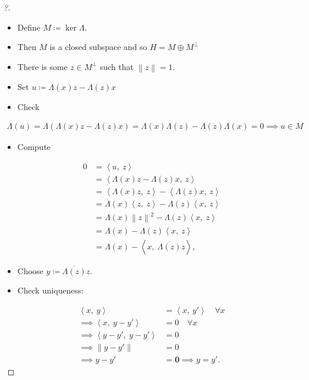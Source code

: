 \begin{proof}[?]

\envlist

\begin{itemize}
\tightlist
\item
  Define \(M \coloneqq\ker \Lambda\).
\item
  Then \(M\) is a closed subspace and so \(H = M \oplus M^\perp\)
\item
  There is some \(z\in M^\perp\) such that
  \({\left\lVert {z} \right\rVert} = 1\).
\item
  Set \(u \coloneqq\Lambda(x) z - \Lambda(z) x\)
\item
  Check
\end{itemize}

\begin{align*}\Lambda(u) = \Lambda(\Lambda(x) z - \Lambda(z) x) = \Lambda(x) \Lambda(z) - \Lambda(z) \Lambda(x) = 0 \implies u\in M\end{align*}

\begin{itemize}
\tightlist
\item
  Compute
\end{itemize}

\begin{align*}
0 &= {\left\langle {u},~{z} \right\rangle} \\ 
&= {\left\langle {\Lambda(x) z - \Lambda(z) x},~{z} \right\rangle} \\
&= {\left\langle {\Lambda(x) z},~{z} \right\rangle} - {\left\langle {\Lambda(z) x},~{z} \right\rangle} \\
&= \Lambda(x) {\left\langle {z},~{z} \right\rangle} - \Lambda(z) {\left\langle {x},~{z} \right\rangle} \\
&= \Lambda(x) {\left\lVert {z} \right\rVert}^2 - \Lambda(z) {\left\langle {x},~{z} \right\rangle} \\
&= \Lambda(x) - \Lambda(z) {\left\langle {x},~{z} \right\rangle} \\
&= \Lambda(x) -  {\left\langle {x},~{\overline{\Lambda(z)} z} \right\rangle}
,\end{align*}

\begin{itemize}
\tightlist
\item
  Choose \(y \coloneqq\overline{\Lambda(z)} z\).
\item
  Check uniqueness:
\end{itemize}

\begin{align*}
{\left\langle {x},~{y} \right\rangle} &= {\left\langle {x},~{y'} \right\rangle} \quad\forall x \\
\implies  {\left\langle {x},~{y-y'} \right\rangle} &= 0 \quad\forall x \\
\implies {\left\langle {y-y'},~{y-y'} \right\rangle} &= 0 \\
\implies {\left\lVert {y-y'} \right\rVert} &= 0 \\
\implies y-y' &= \mathbf{0} \implies y = y'
.\end{align*}

\end{proof}


